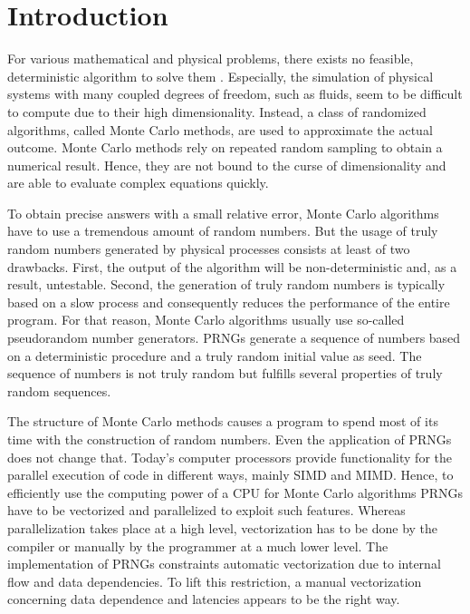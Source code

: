 \documentclass{stdlocal}
\begin{document}
\section{Introduction} %
\label{sec:introduction}

For various mathematical and physical problems, there exists no feasible, deterministic algorithm to solve them \autocite{pharr2016}.
Especially, the simulation of physical systems with many coupled degrees of freedom, such as fluids, seem to be difficult to compute due to their high dimensionality.
Instead, a class of randomized algorithms, called Monte Carlo methods, are used to approximate the actual outcome.
Monte Carlo methods rely on repeated random sampling to obtain a numerical result.
Hence, they are not bound to the curse of dimensionality and are able to evaluate complex equations quickly.

To obtain precise answers with a small relative error, Monte Carlo algorithms have to use a tremendous amount of random numbers.
But the usage of truly random numbers generated by physical processes consists at least of two drawbacks.
First, the output of the algorithm will be non-deterministic and, as a result, untestable.
Second, the generation of truly random numbers is typically based on a slow process and consequently reduces the performance of the entire program.
For that reason, Monte Carlo algorithms usually use so-called pseudorandom number generators.
PRNGs generate a sequence of numbers based on a deterministic procedure and a truly random initial value as seed.
The sequence of numbers is not truly random but fulfills several properties of truly random sequences.

The structure of Monte Carlo methods causes a program to spend most of its time with the construction of random numbers.
Even the application of PRNGs does not change that.
Today's computer processors provide functionality for the parallel execution of code in different ways, mainly SIMD and MIMD.
Hence, to efficiently use the computing power of a CPU for Monte Carlo algorithms PRNGs have to be vectorized and parallelized to exploit such features.
Whereas parallelization takes place at a high level, vectorization has to be done by the compiler or manually by the programmer at a much lower level.
The implementation of PRNGs constraints automatic vectorization due to internal flow and data dependencies.
To lift this restriction, a manual vectorization concerning data dependence and latencies appears to be the right way.
\end{document}
